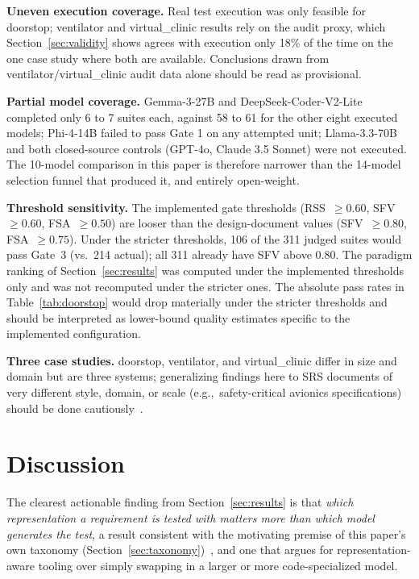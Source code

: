\documentclass[conference]{IEEEtran}
\newcommand{\eg}{e.g.,\ }
\begin{document}
\textbf{Uneven execution coverage.} Real test execution was only feasible for
doorstop; ventilator and virtual\_clinic results rely on the audit proxy,
which Section~\ref{sec:validity} shows agrees with execution only 18\% of the
time on the one case study where both are available. Conclusions drawn from
ventilator/virtual\_clinic audit data alone should be read as provisional.

\textbf{Partial model coverage.} Gemma-3-27B and DeepSeek-Coder-V2-Lite
completed only 6 to 7 suites each, against 58 to 61 for the other eight executed
models; Phi-4-14B failed to pass Gate 1 on any attempted unit; Llama-3.3-70B
and both closed-source controls (GPT-4o, Claude 3.5 Sonnet) were not
executed. The 10-model comparison in this paper is therefore narrower than
the 14-model selection funnel that produced it, and entirely open-weight.

\textbf{Threshold sensitivity.} The implemented gate thresholds (RSS~$\geq 0.60$,
SFV~$\geq 0.60$, FSA~$\geq 0.50$) are looser than the design-document
values (SFV~$\geq 0.80$, FSA~$\geq 0.75$). Under the stricter thresholds,
106 of the 311 judged suites would pass Gate~3 (vs.\ 214 actual);
all 311 already have SFV above 0.80. The paradigm ranking of
Section~\ref{sec:results} was computed under the implemented thresholds only
and was not recomputed under the stricter ones. The absolute pass rates in Table~\ref{tab:doorstop} would
drop materially under the stricter thresholds and should be interpreted as
lower-bound quality estimates specific to the implemented configuration.

\textbf{Three case studies.} doorstop, ventilator, and virtual\_clinic differ
in size and domain but are three systems; generalizing findings here to SRS
documents of very different style, domain, or scale (\eg safety-critical
avionics specifications) should be done cautiously~\cite{wohlin2012experimentation}.

\section{Discussion}

The clearest actionable finding from Section~\ref{sec:results} is that
\emph{which representation a requirement is tested with matters more than
which model generates the test}, a result consistent with the motivating
premise of this paper's own taxonomy (Section~\ref{sec:taxonomy})~\cite{utting2012taxonomy}, and one
that argues for representation-aware tooling over simply swapping in a larger
or more code-specialized model.
\end{document}

